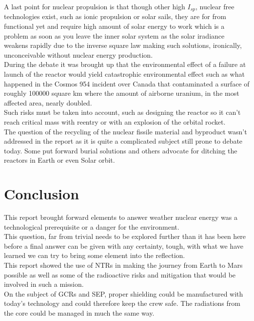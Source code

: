\documentclass[12pt,a4paper]{report}
\begin{document}
A last point for nuclear propulsion is that though other high $I_{sp}$, nuclear free technologies exist, such as ionic propulsion or solar sails, they are for from functional yet and require high amount of solar energy to work which is a problem as soon as you leave the inner solar system as the solar iradiance weakens rapidly due to the inverse square law making such solutions, ironically, unconceivable without nuclear energy production.\\

During the debate it was brought up that the environmental effect of a failure at launch of the reactor would yield catastrophic environmental effect such as what happened in the Cosmos 954 incident over Canada that contaminated a surface of roughly 100000 square km where the amount of airborne uranium, in the most affected area, nearly doubled.\\

Such risks must be taken into account, such as designing the reactor so it can't reach critical mass with reentry or with an explosion of the orbital rocket.\\

The question of the recycling of the nuclear fissile material and byproduct wasn't addressed in the report as it is quite a complicated subject still prone to debate today. Some put forward burial solutions and others advocate for ditching the reactors in Earth or even Solar orbit.\\



\chapter{Conclusion}

\quad This report brought forward elements to answer weather nuclear energy was a technological prerequisite or a danger for the environment.\\
This question, far from trivial needs to be explored further than it has been here before a final answer can be given with any certainty, tough, with what we have learned we can try to bring some element into the reflection.\\

This report showed the use of NTRs in making the journey from Earth to Mars possible as well as some of the radioactive risks and mitigation that would be involved in such a mission.\\

On the subject of GCRs and SEP, proper shielding could be manufactured with today's technology and could therefore keep the crew safe. The radiations from the core could be managed in much the same way.\\
\end{document}
